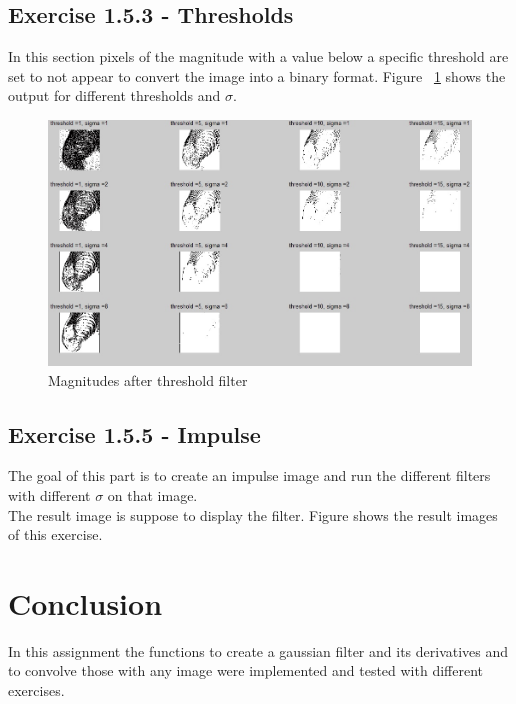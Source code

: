 \documentclass[11pt]{article}
\begin{document}
\subsection{Exercise 1.5.3 - Thresholds}
In this section pixels of the magnitude with a value below a specific threshold are set to not appear to convert the image into a binary format. Figure ~\ref{threshold} shows the output for different thresholds and $\sigma$.

\begin{figure}[h!]
\includegraphics[scale=0.6]{Thresholds.jpg}
\caption{Magnitudes after threshold filter}
\label{threshold}
\end{figure}

\subsection{Exercise 1.5.5 - Impulse}
The goal of this part is to create an impulse image and run the different filters with different $\sigma$ on that image.\\
The result image is suppose to display the filter. Figure shows the result images of this exercise.

\section{Conclusion}
In this assignment the functions to create a gaussian filter and its derivatives and to convolve those with any image were implemented and tested with different exercises. 
\end{document}
